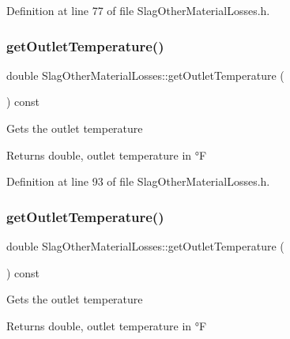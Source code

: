 Definition at line 77 of file Slag\+Other\+Material\+Losses.\+h.

\mbox{\label{class_slag_other_material_losses_a1c48f1a70aaf030451b7e350f3d6cd18}} 
\subsubsection{\texorpdfstring{get\+Outlet\+Temperature()}{getOutletTemperature()}\hspace{0.1cm}{\footnotesize\ttfamily [1/3]}}
{\footnotesize\ttfamily double Slag\+Other\+Material\+Losses\+::get\+Outlet\+Temperature (\begin{DoxyParamCaption}{ }\end{DoxyParamCaption}) const\hspace{0.3cm}{\ttfamily [inline]}}

Gets the outlet temperature \begin{DoxyReturn}{Returns}
double, outlet temperature in °F 
\end{DoxyReturn}


Definition at line 93 of file Slag\+Other\+Material\+Losses.\+h.

\mbox{\label{class_slag_other_material_losses_a1c48f1a70aaf030451b7e350f3d6cd18}} 
\subsubsection{\texorpdfstring{get\+Outlet\+Temperature()}{getOutletTemperature()}\hspace{0.1cm}{\footnotesize\ttfamily [2/3]}}
{\footnotesize\ttfamily double Slag\+Other\+Material\+Losses\+::get\+Outlet\+Temperature (\begin{DoxyParamCaption}{ }\end{DoxyParamCaption}) const\hspace{0.3cm}{\ttfamily [inline]}}

Gets the outlet temperature \begin{DoxyReturn}{Returns}
double, outlet temperature in °F 
\end{DoxyReturn}


